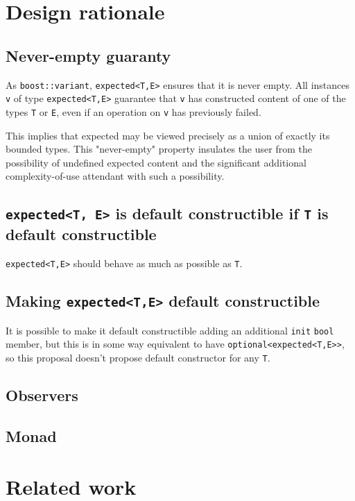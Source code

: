 \documentclass[a4paper,10pt]{article}
\newcommand{\cpp}[1]{\lstinline{#1}}
\begin{document}
\section{Design rationale}


\subsection{Never-empty guaranty}

As \cpp{boost::variant}, \cpp{expected<T,E>} ensures that it is never empty.
All instances \cpp{v} of type \cpp{expected<T,E>} guarantee that \cpp{v} has constructed content of one of the types \cpp{T} or \cpp{E}, even if an operation on \cpp{v} has previously failed.

This implies that expected may be viewed precisely as a union of exactly its bounded types. This "never-empty" property insulates the user from the possibility of undefined expected content and the significant additional complexity-of-use attendant with such a possibility.

\subsection{\cpp{expected<T, E>} is default constructible if \cpp{T} is default constructible}

\cpp{expected<T,E>} should behave as much as possible as \cpp{T}. 

\subsection{Making \cpp{expected<T,E>} default constructible}
It is possible to make it default constructible adding an additional \cpp{init} \cpp{bool} member, but this is in some way equivalent to have \cpp{optional<expected<T,E>>}, so this proposal doesn't propose default constructor for any \cpp{T}.

\subsection{Observers}


\subsection{Monad}


\section{Related work}
\end{document}
